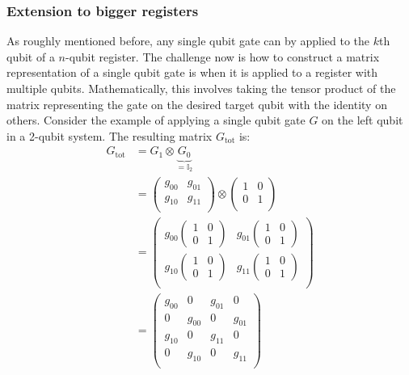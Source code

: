 \documentclass[bibliography=totocnumbered, 10pt]{article}
\theoremstyle{NoticeStyle}
\begin{document}
\subsubsection{Extension to bigger registers}
As roughly mentioned before, any single qubit gate can by applied to the $k$th qubit of a $n$-qubit register. The challenge now is how to construct a matrix representation of a single qubit gate is when it is applied to a register with multiple qubits. Mathematically, this involves taking the tensor product of the matrix representing the gate on the desired target qubit with the identity on others. Consider the example of applying a single qubit gate $G$ on the left qubit in a 2-qubit system. The resulting matrix $G_\text{tot}$ is:
%
\begin{align}
	G_\text{tot} 
	&= G_1 \otimes \underbrace{G_0}_{=\mathbb{I}_2}\\
	&=
	\begin{pmatrix}
		g_{00} & g_{01}\\
		g_{10} & g_{11}\\
	\end{pmatrix}
	\otimes
	\begin{pmatrix}
		1 & 0\\
		0 & 1\\
	\end{pmatrix}\\
	&=
	\begin{pmatrix}
		g_{00} \left(\begin{smallmatrix}1& 0\\ 0& 1\end{smallmatrix}\right) & g_{01} \left(\begin{smallmatrix}1& 0\\ 0& 1\end{smallmatrix}\right)\\
		g_{10} \left(\begin{smallmatrix}1& 0\\ 0& 1\end{smallmatrix}\right) & g_{11} \left(\begin{smallmatrix}1& 0\\ 0& 1\end{smallmatrix}\right)\\
	\end{pmatrix}
	\\
	&=
	\begin{pmatrix}
		g_{00} & 0 & g_{01} & 0\\
		0 & g_{00} & 0 & g_{01}\\
		g_{10} & 0 & g_{11} & 0\\
		0 & g_{10} & 0 & g_{11}\\
	\end{pmatrix}
\end{align}
\end{document}

